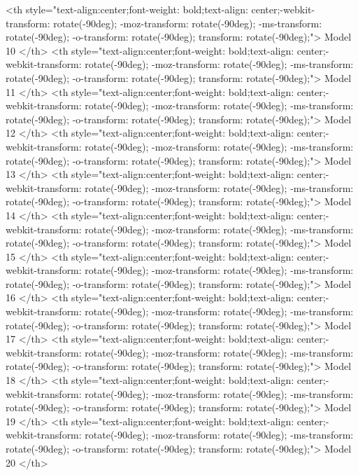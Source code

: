    <th style="text-align:center;font-weight: bold;text-align: center;-webkit-transform: rotate(-90deg); -moz-transform: rotate(-90deg); -ms-transform: rotate(-90deg); -o-transform: rotate(-90deg); transform: rotate(-90deg);"> Model 10 </th>
   <th style="text-align:center;font-weight: bold;text-align: center;-webkit-transform: rotate(-90deg); -moz-transform: rotate(-90deg); -ms-transform: rotate(-90deg); -o-transform: rotate(-90deg); transform: rotate(-90deg);"> Model 11 </th>
   <th style="text-align:center;font-weight: bold;text-align: center;-webkit-transform: rotate(-90deg); -moz-transform: rotate(-90deg); -ms-transform: rotate(-90deg); -o-transform: rotate(-90deg); transform: rotate(-90deg);"> Model 12 </th>
   <th style="text-align:center;font-weight: bold;text-align: center;-webkit-transform: rotate(-90deg); -moz-transform: rotate(-90deg); -ms-transform: rotate(-90deg); -o-transform: rotate(-90deg); transform: rotate(-90deg);"> Model 13 </th>
   <th style="text-align:center;font-weight: bold;text-align: center;-webkit-transform: rotate(-90deg); -moz-transform: rotate(-90deg); -ms-transform: rotate(-90deg); -o-transform: rotate(-90deg); transform: rotate(-90deg);"> Model 14 </th>
   <th style="text-align:center;font-weight: bold;text-align: center;-webkit-transform: rotate(-90deg); -moz-transform: rotate(-90deg); -ms-transform: rotate(-90deg); -o-transform: rotate(-90deg); transform: rotate(-90deg);"> Model 15 </th>
   <th style="text-align:center;font-weight: bold;text-align: center;-webkit-transform: rotate(-90deg); -moz-transform: rotate(-90deg); -ms-transform: rotate(-90deg); -o-transform: rotate(-90deg); transform: rotate(-90deg);"> Model 16 </th>
   <th style="text-align:center;font-weight: bold;text-align: center;-webkit-transform: rotate(-90deg); -moz-transform: rotate(-90deg); -ms-transform: rotate(-90deg); -o-transform: rotate(-90deg); transform: rotate(-90deg);"> Model 17 </th>
   <th style="text-align:center;font-weight: bold;text-align: center;-webkit-transform: rotate(-90deg); -moz-transform: rotate(-90deg); -ms-transform: rotate(-90deg); -o-transform: rotate(-90deg); transform: rotate(-90deg);"> Model 18 </th>
   <th style="text-align:center;font-weight: bold;text-align: center;-webkit-transform: rotate(-90deg); -moz-transform: rotate(-90deg); -ms-transform: rotate(-90deg); -o-transform: rotate(-90deg); transform: rotate(-90deg);"> Model 19 </th>
   <th style="text-align:center;font-weight: bold;text-align: center;-webkit-transform: rotate(-90deg); -moz-transform: rotate(-90deg); -ms-transform: rotate(-90deg); -o-transform: rotate(-90deg); transform: rotate(-90deg);"> Model 20 </th>
